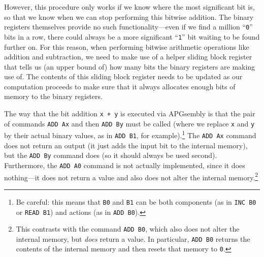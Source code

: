 However, this procedure only works if we know where the most significant bit is, so that we know when we can stop performing this bitwise addition. The binary registers themselves provide no such functionality---even if we find a million ``\texttt{0}'' bits in a row, there could always be a more significant ``\texttt{1}'' bit waiting to be found further on. For this reason, when performing bitwise arithmetic operations like addition and subtraction, we need to make use of a helper sliding block register that tells us (an upper bound of) how many bits the binary registers are making use of. The contents of this sliding block register needs to be updated as our computation proceeds to make sure that it always allocates enough bits of memory to the binary registers.

The way that the bit addition \texttt{x + y} is executed via APGsembly is that the pair of commands \texttt{ADD~Ax} and then \texttt{ADD~By} must be called (where we replace \texttt{x} and \texttt{y} by their actual binary values, as in \texttt{ADD B1}, for example).\footnote{Be careful: this means that \texttt{B0} and \texttt{B1} can be both components (as in \texttt{INC B0} or \texttt{READ B1}) and actions (as in \texttt{ADD B0}).} The \texttt{ADD Ax} command does not return an output (it just adds the input bit to the internal memory), but the \texttt{ADD By} command does (so it should always be used second). Furthermore, the \texttt{ADD A0} command is not actually implemented, since it does nothing---it does not return a value and also does not alter the internal memory.\footnote{This contrasts with the command \texttt{ADD B0}, which also does not alter the internal memory, but \emph{does} return a value. In particular, \texttt{ADD B0} returns the contents of the internal memory and then resets that memory to \texttt{0}.}

